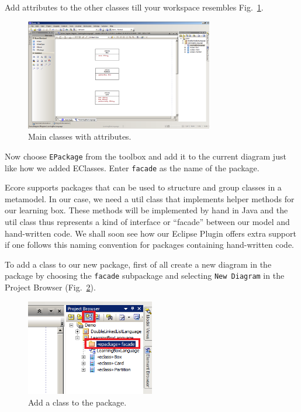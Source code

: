 Add attributes to the other classes till your workspace resembles
Fig.~\ref{fig:attribute_completed}.

\begin{figure}[htbp]
	\centering
  \includegraphics[width=0.73\textwidth]{pics/memBoxBilder/memBox14.png}
	\caption{Main classes with attributes.}
	\label{fig:attribute_completed}
\end{figure}

\clearpage

Now choose \texttt{EPackage} from the toolbox and add it to the current diagram
just like how we added EClasses. Enter \texttt{facade} as the name of the
package. 
 
Ecore supports packages that can be used to structure and group classes
in a metamodel.  In our case, we need  a util class that implements helper
methods for our learning box.  These methods  will be implemented by hand in Java
and the util class thus represents a kind of  interface or ``facade'' between
our model and hand-written code.  We shall soon  see how our Eclipse Plugin
offers extra support if one follows this naming  convention for packages
containing hand-written code. 

To add a class to our new package, first of all create a new diagram in
the package by choosing the \texttt{facade} subpackage and selecting \texttt{New
Diagram} in the Project Browser (Fig.~\ref{fig:epackage_newelement}).

\begin{figure}[htbp]
	\centering
  \includegraphics[width=0.5\textwidth]{pics/memBoxBilder/memBox19}
	\caption{Add a class to the package.}
	\label{fig:epackage_newelement}
\end{figure}


